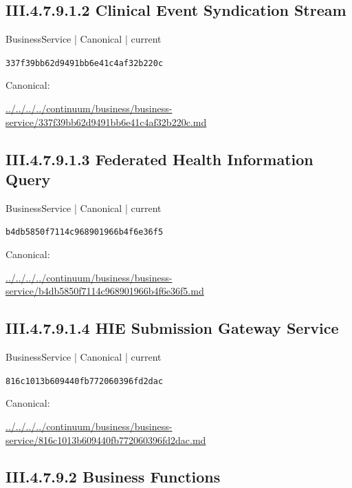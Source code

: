 \documentclass[10pt,a4paper]{article}
\begin{document}
\subsection*{III.4.7.9.1.2 Clinical Event Syndication Stream}
\label{element-337f39bb62d9491bb6e41c4af32b220c}
{\small BusinessService | Canonical | current}\par
\texttt{337f39bb62d9491bb6e41c4af32b220c}\par
Canonical: \par
{\footnotesize\url{../../../../continuum/business/business-service/337f39bb62d9491bb6e41c4af32b220c.md}}\par
\subsection*{III.4.7.9.1.3 Federated Health Information Query}
\label{element-b4db5850f7114c968901966b4f6e36f5}
{\small BusinessService | Canonical | current}\par
\texttt{b4db5850f7114c968901966b4f6e36f5}\par
Canonical: \par
{\footnotesize\url{../../../../continuum/business/business-service/b4db5850f7114c968901966b4f6e36f5.md}}\par
\subsection*{III.4.7.9.1.4 HIE Submission Gateway Service}
\label{element-816c1013b609440fb772060396fd2dac}
{\small BusinessService | Canonical | current}\par
\texttt{816c1013b609440fb772060396fd2dac}\par
Canonical: \par
{\footnotesize\url{../../../../continuum/business/business-service/816c1013b609440fb772060396fd2dac.md}}\par
\subsection*{III.4.7.9.2 Business Functions}
\end{document}
